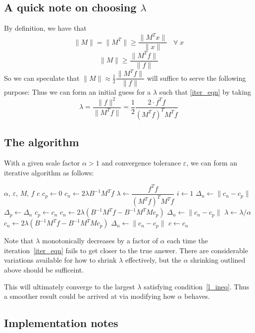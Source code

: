\documentclass[12pt,a4paper]{article}
\newcommand{\eps}{\varepsilon}
\begin{document}
\subsection{A quick note on choosing $\lambda$}
By definition, we have that
\[
    \| M \| = \| M^T \| \ge \dfrac{\|M^Tx\|}{\|x\|} \;\;\; \forall \; x 
\]
\[
    \| M \| \ge \dfrac{\|M^Tf\|}{\|f\|}
\]
So we can speculate that $\|M\| \approx \frac{1}{2} \dfrac{\|M^Tf\|}{\|f\|}$ will
suffice to serve the following purpose: 
Thus we can form an initial guess for a $\lambda$ such that \ref{iter_eqn} by
taking
\[
    \lambda = \dfrac{\|f\|^2}{\|M^T f\|} = \dfrac{1}{2} \dfrac{2 \cdot f^T f}{(M^T f)^T M^T f}
\]

\subsection{The algorithm}
With a given scale factor $\alpha > 1$ and convergence tolerance $\eps$,
we can form an iterative algorithm as follows:
\begin{algorithmic}
    \Require $\alpha$, $\eps$, $M$, $f$ 
    \Ensure $c$
    \State $c_p \gets 0$
    \State $c_n \gets 2 \lambda B^{-1} M^T f$
    \State $\lambda \gets \dfrac{f^T f}{(M^T f)^T M^T f}$
    \State $i \gets 1$
    \State $\Delta_n \gets \|c_n - c_p\|$
    \While{$\Delta_n \ge \eps$}
        \State $\Delta_p \gets \Delta_n$
        \State $c_p \gets c_n$
        \State $c_n \gets 2\lambda \left( B^{-1} M^T f - B^{-1} M^T M c_p\right)$
        \State $\Delta_n \gets \|c_n - c_p\|$
            \State $\lambda \gets \lambda / \alpha$
            \State $c_n \gets 2\lambda \left( B^{-1} M^T f - B^{-1} M^T M c_p\right)$
            \State $\Delta_n \gets \|c_n - c_p\|$
        \EndWhile
    \EndWhile
    \State $c \gets c_n$
\end{algorithmic}
Note that $\lambda$ monotonically decreases by a factor of $\alpha$ each time
the iteration~\ref{iter_eqn} fails to get closer to the true answer.
There are considerable variations available for how to shrink $\lambda$ effectively,
but the $\alpha$ shrinking outlined above should be sufficeint.

This will ultimately converge to the largest $\lambda$ satisfying condition~\ref{l_ineq}.
Thus a smoother result could be arrived at via modifying how $\alpha$ behaves.

\subsection{Implementation notes}
\end{document}
